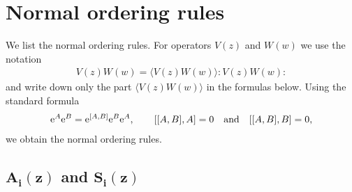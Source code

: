 \documentclass[10pt,a4paper]{amsart}
\numberwithin{equation}{section}
\begin{document}
\appendix

\section{Normal ordering rules}
\label{appendix:normal}

We list the normal ordering rules.
For operators $V(z)$ and $W(w)$ we use the notation
\begin{gather}
V(z)W(w)=\langle V(z)W(w) \rangle {:}V(z)W(w){:}
\label{def:coupling}
\end{gather}
and write down only the part $\langle V(z)W(w) \rangle$
in the formulas below. Using the standard formula
\begin{gather*}
{\rm e}^A{\rm e}^B={\rm e}^{[A,B]}{\rm e}^B{\rm e}^A,\qquad [[A,B],A]=0\quad \text{and}\quad [[A,B],B]=0,
\end{gather*}
we obtain the normal ordering rules.

\subsection[\protect{$A\_\{i\}(z)$} and \protect{$S\_\{i\}(z)$}]
{$\boldsymbol{A_i(z)}$ and $\boldsymbol{S_i(z)}$}
\end{document}
